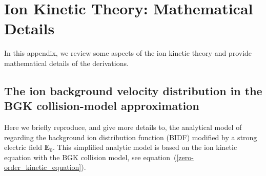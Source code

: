 \documentclass[draft]{agujournal2019}
\renewcommand{\vec}{\mathbf}
\begin{document}
{\appendix

\section{Ion Kinetic Theory: Mathematical Details\label{Ion kinetic theory}}

In this appendix, we review some aspects of the ion kinetic theory and provide mathematical details of the derivations.

\subsection{The ion background velocity distribution in the BGK collision-model
approximation\label{The ion background velocity distribution in the BGK approximation}}

Here we briefly reproduce, and give more details to, the analytical model of
 regarding the background ion distribution function (BIDF) 
modified by a strong electric field $\vec{E}_0$. This simplified analytic model is based on the ion 
kinetic equation with the BGK collision model, see equation~(\ref{zero-order_kinetic_equation}).

}
\end{document}
